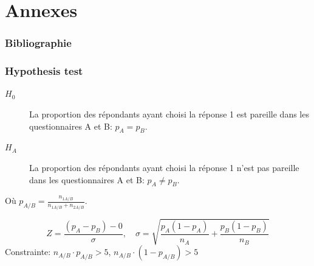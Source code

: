 \documentclass{beamer}
\begin{document}
\section{Annexes}
\begin{frame}
\frametitle{Bibliographie}
\end{frame}

\begin{frame}
  \frametitle{Hypothesis test}
  \begin{description}
  \item[$H_0$] La proportion des répondants ayant choisi la réponse 1 est
                pareille dans les questionnaires A et B: $p_A = p_B$. 
  \item[$H_A$] La proportion des répondants ayant choisi la réponse
                1 n’est pas  pareille dans les questionnaires A et B: $p_A \ne p_B$.
  \end{description}
  Où $p_{A/B}  = \frac{n_{1A/B}}{n_{1A/B}  + n_{2A/B}}$.

  \[
  Z = \frac{(p_A-p_B) - 0}{\sigma} ,\quad
  \sigma = \sqrt{\frac{p_A(1-p_A)}{n_A} + \frac{p_B(1-p_B)}{n_B}} 
  \]
  Constrainte: $n_{A/B} \cdot p_{A/B} > 5$, $n_{A/B} \cdot (1-p_{A/B}) > 5$ 
\end{frame}
\end{document}
